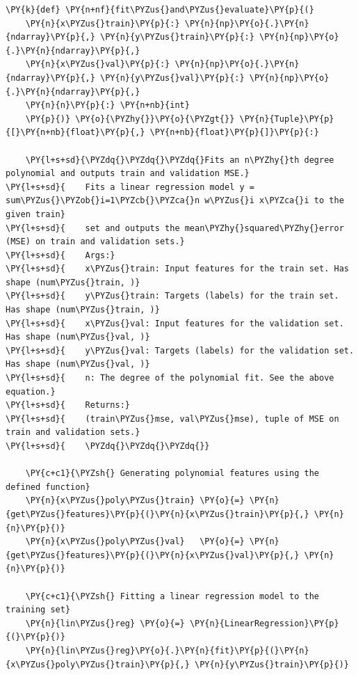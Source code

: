 \documentclass[a4paper,11pt]{article}%
\begin{document}
    \begin{tcolorbox}[breakable, size=fbox, boxrule=1pt, pad at break*=1mm,colback=cellbackground, colframe=cellborder]
\begin{Verbatim}[commandchars=\\\{\}]
\PY{k}{def} \PY{n+nf}{fit\PYZus{}and\PYZus{}evaluate}\PY{p}{(}
    \PY{n}{x\PYZus{}train}\PY{p}{:} \PY{n}{np}\PY{o}{.}\PY{n}{ndarray}\PY{p}{,} \PY{n}{y\PYZus{}train}\PY{p}{:} \PY{n}{np}\PY{o}{.}\PY{n}{ndarray}\PY{p}{,}
    \PY{n}{x\PYZus{}val}\PY{p}{:} \PY{n}{np}\PY{o}{.}\PY{n}{ndarray}\PY{p}{,} \PY{n}{y\PYZus{}val}\PY{p}{:} \PY{n}{np}\PY{o}{.}\PY{n}{ndarray}\PY{p}{,}
    \PY{n}{n}\PY{p}{:} \PY{n+nb}{int}
    \PY{p}{)} \PY{o}{\PYZhy{}}\PY{o}{\PYZgt{}} \PY{n}{Tuple}\PY{p}{[}\PY{n+nb}{float}\PY{p}{,} \PY{n+nb}{float}\PY{p}{]}\PY{p}{:}
    
    \PY{l+s+sd}{\PYZdq{}\PYZdq{}\PYZdq{}Fits an n\PYZhy{}th degree polynomial and outputs train and validation MSE.}
\PY{l+s+sd}{    Fits a linear regression model y = sum\PYZus{}\PYZob{}i=1\PYZcb{}\PYZca{}n w\PYZus{}i x\PYZca{}i to the given train}
\PY{l+s+sd}{    set and outputs the mean\PYZhy{}squared\PYZhy{}error (MSE) on train and validation sets.}
\PY{l+s+sd}{    Args:}
\PY{l+s+sd}{    x\PYZus{}train: Input features for the train set. Has shape (num\PYZus{}train, )}
\PY{l+s+sd}{    y\PYZus{}train: Targets (labels) for the train set. Has shape (num\PYZus{}train, )}
\PY{l+s+sd}{    x\PYZus{}val: Input features for the validation set. Has shape (num\PYZus{}val, )}
\PY{l+s+sd}{    y\PYZus{}val: Targets (labels) for the validation set. Has shape (num\PYZus{}val, )}
\PY{l+s+sd}{    n: The degree of the polynomial fit. See the above equation.}
\PY{l+s+sd}{    Returns:}
\PY{l+s+sd}{    (train\PYZus{}mse, val\PYZus{}mse), tuple of MSE on train and validation sets.}
\PY{l+s+sd}{    \PYZdq{}\PYZdq{}\PYZdq{}}

    \PY{c+c1}{\PYZsh{} Generating polynomial features using the defined function}
    \PY{n}{x\PYZus{}poly\PYZus{}train} \PY{o}{=} \PY{n}{get\PYZus{}features}\PY{p}{(}\PY{n}{x\PYZus{}train}\PY{p}{,} \PY{n}{n}\PY{p}{)}
    \PY{n}{x\PYZus{}poly\PYZus{}val}   \PY{o}{=} \PY{n}{get\PYZus{}features}\PY{p}{(}\PY{n}{x\PYZus{}val}\PY{p}{,} \PY{n}{n}\PY{p}{)}
    
    \PY{c+c1}{\PYZsh{} Fitting a linear regression model to the training set}
    \PY{n}{lin\PYZus{}reg} \PY{o}{=} \PY{n}{LinearRegression}\PY{p}{(}\PY{p}{)}
    \PY{n}{lin\PYZus{}reg}\PY{o}{.}\PY{n}{fit}\PY{p}{(}\PY{n}{x\PYZus{}poly\PYZus{}train}\PY{p}{,} \PY{n}{y\PYZus{}train}\PY{p}{)}


\end{Verbatim}
\end{tcolorbox}
\end{document}
